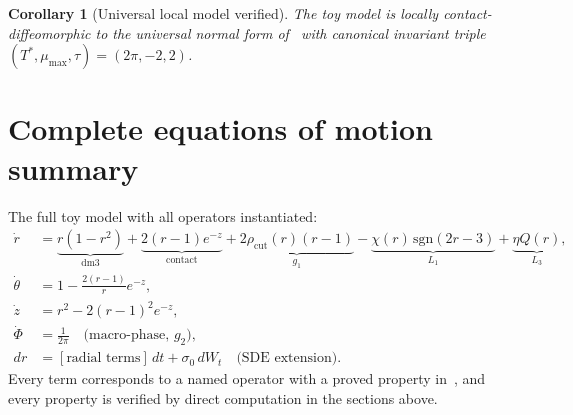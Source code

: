 \documentclass[reqno]{amsart}
\numberwithin{equation}{section}
\theoremstyle{plain}
\newtheorem{corollary}[theorem]{Corollary}
\theoremstyle{definition}
\theoremstyle{remark}
\begin{document}
\begin{corollary}[Universal local model verified]\label{cor:universal}
The toy model is locally contact-diffeomorphic to the universal
normal form of~\cite{Paper1} with canonical invariant triple
$(T^*,\mu_{\max},\tau)=(2\pi,-2,2)$.
\end{corollary}

\section{Complete equations of motion summary}\label{sec:summary}

The full toy model with all operators instantiated:
\begin{align}
  \dot r &= \underbrace{r(1-r^2)}_{\text{dm3}}
           + \underbrace{2(r-1)e^{-z}}_{\text{contact}}
           + \underbrace{2\rho_{\mathrm{cut}}(r)(r-1)}_{g_1}
           - \underbrace{\chi(r)\,\mathrm{sgn}(2r-3)}_{L_1}
           + \underbrace{\eta Q(r)}_{L_3},\\
  \dot\theta &= 1 - \frac{2(r-1)}{r}e^{-z},\\
  \dot z &= r^2 - 2(r-1)^2 e^{-z},\\
  \dot\Phi &= \frac{1}{2\pi}\quad\text{(macro-phase, }g_2\text{)},\\
  dr &= [\text{radial terms}]\,dt + \sigma_0\,dW_t\quad
       \text{(SDE extension)}.
\end{align}
Every term corresponds to a named operator with a proved property
in~\cite{Paper1}, and every property is verified by direct computation
in the sections above.
\end{document}
